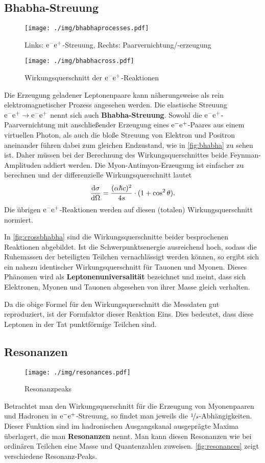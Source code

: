 \subsection{Bhabha-Streuung}
\begin{figure}
	\centering
	\texttt{[image: ./img/bhabhaprocesses.pdf]}
	\caption{Links: $\el\pos$-Streuung, Rechts: Paarvernichtung/-erzeugung}
	\label{fig:bhabha}
\end{figure}
\begin{figure}
	\centering
	\texttt{[image: ./img/bhabhacross.pdf]}
	\caption{Wirkungsquerschnitt der $\el\pos$-Reaktionen}
	\label{fig:crossbhabha}
\end{figure}
Die Erzeugung geladener Leptonenpaare kann näherungsweise als rein elektromagnetischer Prozess angesehen werden.
Die elastische Streuung $\el\pos\rightarrow\el\pos$ nennt sich auch \textbf{Bhabha-Streuung}.
Sowohl die $\el\pos$-Paarvernichtung mit anschließender Erzeugung eines $\el\pos$-Paares aus einem virtuellen Photon, als auch die bloße Streuung von Elektron und Positron aneinander führen dabei zum gleichen Endzustand, wie in \autoref{fig:bhabha} zu sehen ist.
Daher müssen bei der Berechnung des Wirkungsquerschnittes beide Feynman-Amplituden addiert werden.
Die Myon-Antimyon-Erzeugung ist einfacher zu berechnen und der differenzielle Wirkungsquerschnitt lautet
\begin{equation*}
	\diff[\sigma]{\Omega} = \frac{(\alpha\hbar c)^2}{4s}\cdot(1+\cos^2\theta).
\end{equation*}
Die übrigen $\el\pos$-Reaktionen werden auf diesen (totalen) Wirkungsquerschnitt normiert.

In \autoref{fig:crossbhabha} sind die Wirkungsquerschnitte beider besprochenen Reaktionen abgebildet.
Ist die Schwerpunktsenergie ausreichend hoch, sodass die Ruhemassen der beteiligten Teilchen vernachlässigt werden können, so ergibt sich ein nahezu identischer Wirkungsquerschnitt für Tauonen und Myonen.
Dieses Phänomen wird als \textbf{Leptonenuniversalität} bezeichnet und meint, dass sich Elektronen, Myonen und Tauonen abgesehen von ihrer Masse gleich verhalten.

Da die obige Formel für den Wirkungsquerschnitt die Messdaten gut reproduziert, ist der Formfaktor dieser Reaktion Eins.
Dies bedeutet, dass diese Leptonen in der Tat punktförmige Teilchen sind.

\subsection{Resonanzen}
\begin{figure}
	\centering
	\texttt{[image: ./img/resonances.pdf]}
	\caption{Resonanzpeaks}
	\label{fig:resonances}
\end{figure}
Betrachtet man den Wirkungsquerschnitt für die Erzeugung von Myonenpaaren und Hadronen in $\el\pos$-Streuung, so findet man jeweils die $\nicefrac{1}{s}$-Abhängigkeiten.
Dieser Funktion sind im hadronischen Ausgangskanal ausgeprägte Maxima überlagert, die man \textbf{Resonanzen} nennt.
Man kann diesen Resonanzen wie bei ordinären Teilchen eine Masse und Quantenzahlen zuweisen.
\autoref{fig:resonances} zeigt verschiedene Resonanz-Peaks.

